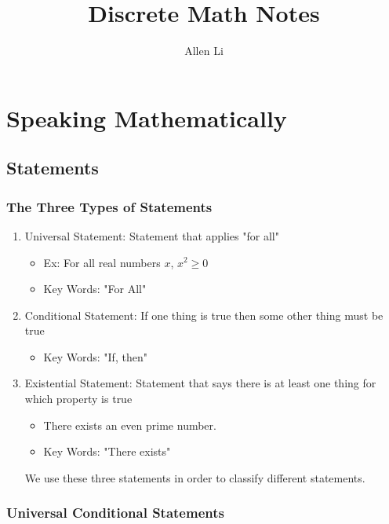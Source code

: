 \documentclass[a4paper]{report}
\title{Discrete Math Notes}
\author{Allen Li}
\begin{document}
\maketitle

\newpage
\tableofcontents{}
\newpage

\chapter{Speaking Mathematically}

\section{Statements}

\subsection{The Three Types of Statements}

\begin{enumerate}
    \item Universal Statement: Statement that applies "for all"
        \begin{itemize}
            \item Ex: For all real numbers $x$, $x^2 \ge 0$
            \item Key Words: "For All"
        \end{itemize}
    \item Conditional Statement: If one thing is true then some other thing must be true
        \begin{itemize}
            \item Key Words: "If, then"
        \end{itemize}
    \item Existential Statement: Statement that says there is at least one thing for which property is true
        \begin{itemize}
            \item There exists an even prime number.
            \item Key Words: "There exists"
        \end{itemize}
    We use these three statements in order to classify different statements.
    
\end{enumerate}

\subsection{Universal Conditional Statements}
\end{document}
